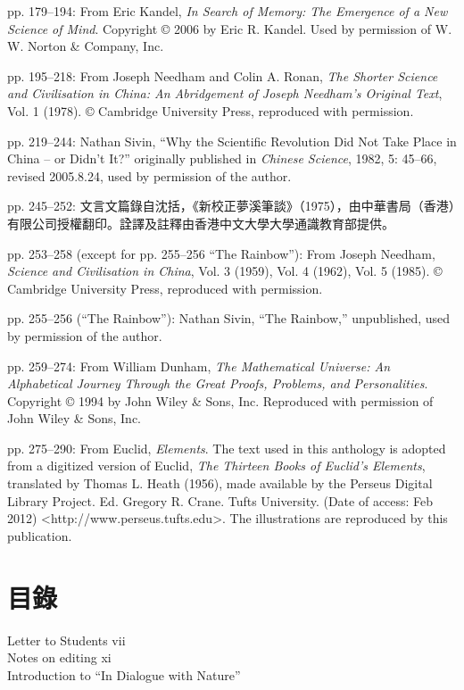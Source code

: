 \documentclass[UTF8,zihao=-4]{ctexart}
\begin{document}
\noindent pp. 179--194: From Eric Kandel, \textit{In Search of Memory: The Emergence of a New Science of Mind}. Copyright © 2006 by Eric R. Kandel. Used by permission of W. W. Norton \& Company, Inc.

\noindent pp. 195--218: From Joseph Needham and Colin A. Ronan, \textit{The Shorter Science and Civilisation in China: An Abridgement of Joseph Needham's Original Text}, Vol. 1 (1978). © Cambridge University Press, reproduced with permission.

\noindent pp. 219--244: Nathan Sivin, ``Why the Scientific Revolution Did Not Take Place in China -- or Didn't It?'' originally published in \textit{Chinese Science}, 1982, 5: 45--66, revised 2005.8.24, used by permission of the author.

\noindent pp. 245--252: 文言文篇錄自沈括，《新校正夢溪筆談》（1975），由中華書局（香港）有限公司授權翻印。詮譯及註釋由香港中文大學大學通識教育部提供。

\noindent pp. 253--258 (except for pp. 255--256 ``The Rainbow''): From Joseph Needham, \textit{Science and Civilisation in China}, Vol. 3 (1959), Vol. 4 (1962), Vol. 5 (1985). © Cambridge University Press, reproduced with permission.

\noindent pp. 255--256 (``The Rainbow''): Nathan Sivin, ``The Rainbow,'' unpublished, used by permission of the author.

\noindent pp. 259--274: From William Dunham, \textit{The Mathematical Universe: An Alphabetical Journey Through the Great Proofs, Problems, and Personalities}. Copyright © 1994 by John Wiley \& Sons, Inc. Reproduced with permission of John Wiley \& Sons, Inc.

\noindent pp. 275--290: From Euclid, \textit{Elements}. The text used in this anthology is adopted from a digitized version of Euclid, \textit{The Thirteen Books of Euclid's Elements}, translated by Thomas L. Heath (1956), made available by the Perseus Digital Library Project. Ed. Gregory R. Crane. Tufts University. (Date of access: Feb 2012) <http://www.perseus.tufts.edu>. The illustrations are reproduced by this publication.

\section*{目錄}
\noindent Letter to Students \dotfill vii\\
Notes on editing \dotfill xi\\
Introduction to ``In Dialogue with Nature'' 
\end{document}
